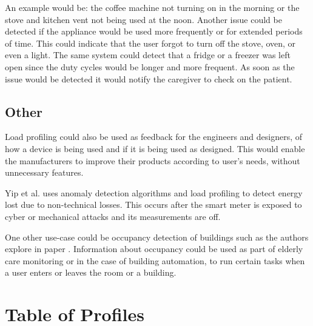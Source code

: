 An example would be: the coffee machine not turning on in the morning or the stove and kitchen vent not being used at the noon.
Another issue could be detected if the appliance would be used more frequently or for extended periods of time. 
This could indicate that the user forgot to turn off the stove, oven, or even a light. The same system could detect 
that a fridge or a freezer was left open since the duty cycles would be longer and more frequent. 
As soon as the issue would be detected it would notify the caregiver to check on the patient.

\subsection{Other}

Load profiling could also be used as feedback for the engineers and designers,
of how a device is being used and if it is being used as designed. 
This would enable the manufacturers to improve their products according to 
user's needs, without unnecessary features.

Yip et al.\cite{energyStealing2018} uses anomaly detection algorithms and load profiling to detect energy lost due to non-technical losses.
This occurs after the smart meter is exposed to cyber or mechanical attacks and its measurements are off. 

One other use-case could be occupancy detection of buildings such as the authors explore in paper \cite{occupancy2013}. Information about 
occupancy could be used as part of elderly care monitoring or in the case of building
automation, to run certain tasks when a user enters or leaves the room or a building.

\section{Table of Profiles}



